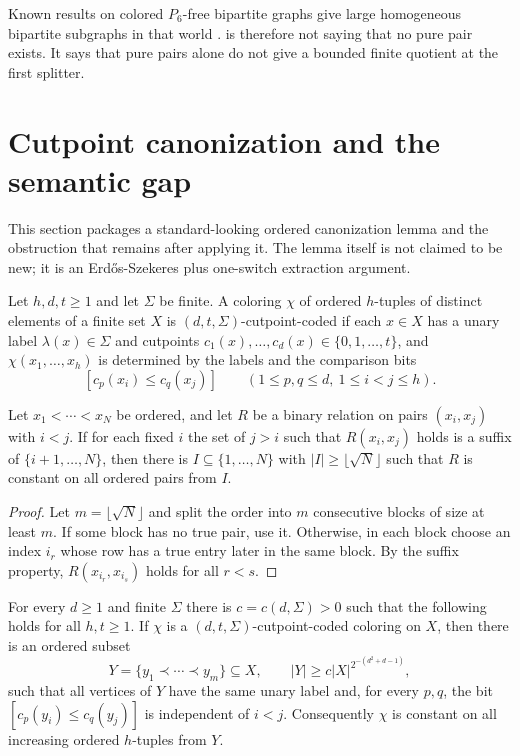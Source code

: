 \begin{remark}
Known results on colored $P_6$-free bipartite graphs give large homogeneous bipartite subgraphs in that world \cite{AlecuAtminasLozinZamaraev2021}.  is therefore not saying that no pure pair exists. It says that pure pairs alone do not give a bounded finite quotient at the first splitter.
\end{remark}

\section{Cutpoint canonization and the semantic gap}

This section packages a standard-looking ordered canonization lemma and the obstruction that remains after applying it. The lemma itself is not claimed to be new; it is an Erd\H{o}s-Szekeres plus one-switch extraction argument.

\begin{definition}
Let $h,d,t\ge 1$ and let $\Sigma$ be finite. A coloring $\chi$ of ordered $h$-tuples of distinct elements of a finite set $X$ is $(d,t,\Sigma)$-cutpoint-coded if each $x\in X$ has a unary label $\lambda(x)\in\Sigma$ and cutpoints $c_1(x),\dots,c_d(x)\in\{0,1,\dots,t\}$, and $\chi(x_1,\dots,x_h)$ is determined by the labels and the comparison bits
\[
  [c_p(x_i)\le c_q(x_j)]
  \qquad (1\le p,q\le d,
  \ 1\le i<j\le h).
\]
\end{definition}

\begin{lemma}\label{lem:one-switch}
Let $x_1<\cdots<x_N$ be ordered, and let $R$ be a binary relation on pairs $(x_i,x_j)$ with $i<j$. If for each fixed $i$ the set of $j>i$ such that $R(x_i,x_j)$ holds is a suffix of $\{i+1,\dots,N\}$, then there is $I\subseteq\{1,\dots,N\}$ with $|I|\ge \lfloor\sqrt N\rfloor$ such that $R$ is constant on all ordered pairs from $I$.
\end{lemma}

\begin{proof}
Let $m=\lfloor\sqrt N\rfloor$ and split the order into $m$ consecutive blocks of size at least $m$. If some block has no true pair, use it. Otherwise, in each block choose an index $i_r$ whose row has a true entry later in the same block. By the suffix property, $R(x_{i_r},x_{i_s})$ holds for all $r<s$.
\end{proof}

\begin{theorem}\label{thm:cutpoint-canonization}
For every $d\ge 1$ and finite $\Sigma$ there is $c=c(d,\Sigma)>0$ such that the following holds for all $h,t\ge 1$. If $\chi$ is a $(d,t,\Sigma)$-cutpoint-coded coloring on $X$, then there is an ordered subset
\[
  Y=\{y_1\prec\cdots\prec y_m\}\subseteq X,
  \qquad |Y|\ge c|X|^{2^{-(d^2+d-1)}},
\]
such that all vertices of $Y$ have the same unary label and, for every $p,q$, the bit $[c_p(y_i)\le c_q(y_j)]$ is independent of $i<j$. Consequently $\chi$ is constant on all increasing ordered $h$-tuples from $Y$.
\end{theorem}

